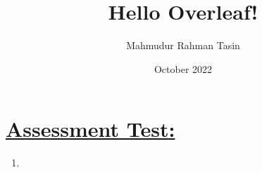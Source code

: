 \documentclass[12pt]{article} %
\title{Hello Overleaf!}
\author{Mahmudur Rahman Tasin}
\date{October 2022}
\begin{document}
\section*{\underline{Assessment Test:}}
\Large{\begin{enumerate}
\item 
\end{enumerate}}
\end{document}
